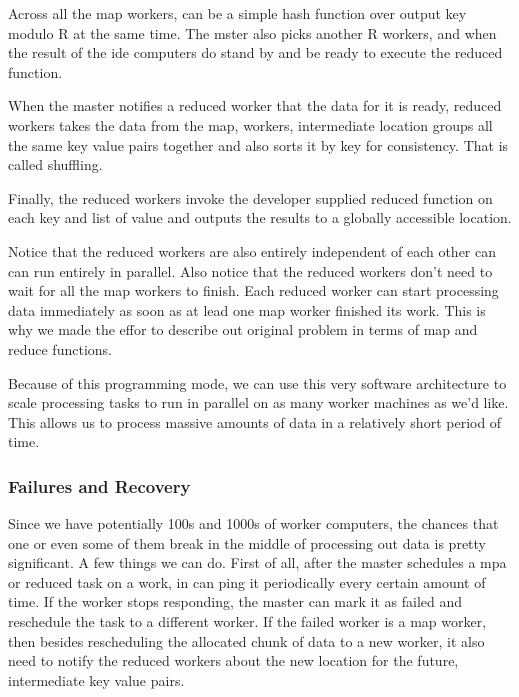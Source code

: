 \documentclass[a4paper, 11pt]{book}
\begin{document}
    Across all the map workers, can be a simple hash function over output key modulo R at the same time.
    The mster also picks another R workers, and when the result of the ide computers do stand by and be ready to execute the reduced function.

    When the master notifies a reduced worker that the data for it is ready, reduced workers takes the data from the map, workers, intermediate location groups all the same key value pairs together and also sorts it by key for consistency.
    That is called shuffling.

    Finally, the reduced workers invoke the developer supplied reduced function on each key and list of value and outputs the results to a globally accessible location.

    Notice that the reduced workers are also entirely independent of each other can can run entirely in parallel.
    Also notice that the reduced workers don't need to wait for all the map workers to finish.
    Each reduced worker can start processing data immediately as soon as at lead one map worker finished its work.
    This is why we made the effor to describe out original problem in terms of map and reduce functions.

    Because of this programming mode, we can use this very software architecture to scale processing tasks to run in parallel on as many worker machines as we'd like.
    This allows us to process massive amounts of data in a relatively short period of time.

    \subsubsection{Failures and Recovery}
    Since we have potentially 100s and 1000s of worker computers, the chances that one or even some of them break in the middle of processing out data is pretty significant.
    A few things we can do.
    First of all, after the master schedules a mpa or reduced task on a work, in can ping it periodically every certain amount of time.
    If the worker stops responding, the master can mark it as failed and reschedule the task to a different worker.
    If the failed worker is a map worker, then besides rescheduling the allocated chunk of data to a new worker, it also need to notify the reduced workers about the new location for the future, intermediate key value pairs.
\end{document}
